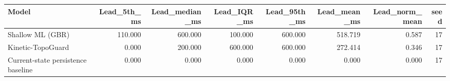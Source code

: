 \begin{tabular}{lrrrrrrr}
\toprule
Model & Lead\_5th\_ms & Lead\_median\_ms & Lead\_IQR\_ms & Lead\_95th\_ms & Lead\_mean\_ms & Lead\_norm\_mean & seed \\
\midrule
Shallow ML (GBR) & 110.000 & 600.000 & 100.000 & 600.000 & 518.719 & 0.587 & 17 \\
Kinetic-TopoGuard & 0.000 & 200.000 & 600.000 & 600.000 & 272.414 & 0.346 & 17 \\
Current-state persistence baseline & 0.000 & 0.000 & 0.000 & 0.000 & 0.000 & 0.000 & 17 \\
\bottomrule
\end{tabular}